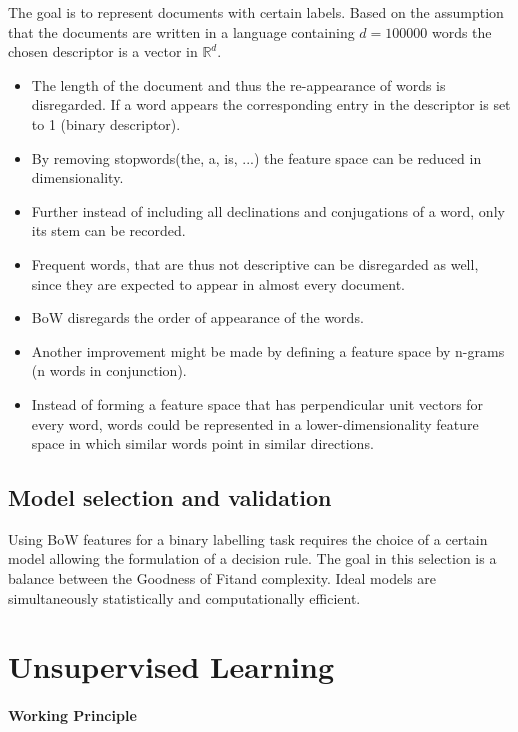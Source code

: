 \documentclass[10pt,a4paper]{scrartcl}
\begin{document}
\begin{multicols*}{2}
The goal is to represent documents with certain labels. Based on the assumption that the documents are written in a language containing $d=100000$ words the chosen descriptor is a vector in $\mathbb{R}^d$.

\begin{itemize}
\item The length of the document and thus the re-appearance of words is disregarded. If a word appears the corresponding entry in the descriptor is set to 1 (binary descriptor).
\item By removing \glqq stopwords\grqq (the, a, is, ...) the feature space can be reduced in dimensionality.
\item Further instead of including all declinations and conjugations of a word, only its stem can be recorded.
\item Frequent words, that are thus not descriptive can be disregarded as well, since they are expected to appear in almost every document.
\item BoW disregards the order of appearance of the words.
\item Another improvement might be made by defining a feature space by n-grams (n words in conjunction).
\item Instead of forming a feature space that has perpendicular unit vectors for every word, words could be represented in a lower-dimensionality feature space in which similar words point in similar directions.
\end{itemize}

\subsection{Model selection and validation}

Using BoW features for a binary labelling task requires the choice of a certain model allowing the formulation of a decision rule. The goal in this selection is a balance between the \glqq Goodness of Fit\grqq and \glqq complexity\grqq. Ideal models are simultaneously statistically and computationally efficient.


\section{Unsupervised Learning}

\paragraph{Working Principle}


\end{multicols*}
\end{document}
